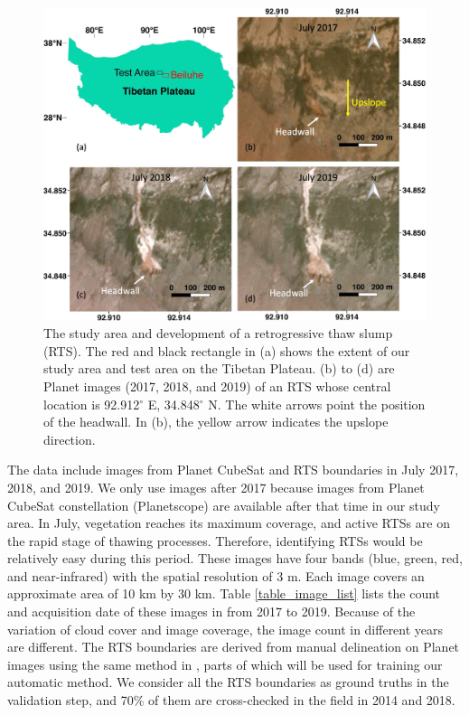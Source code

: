 \documentclass[authoryear,preprint,review,12pt]{elsarticle}
\begin{document}
\begin{figure} 
	\centering
	\includegraphics[width=14cm]{figs/rts_multi_images_study_area_v2_trim.jpg}
	\caption{The study area and development of a retrogressive thaw slump (RTS). The red and black rectangle in (a) shows the extent of our study area and test area on the Tibetan Plateau. (b) to (d) are Planet images (2017, 2018, and 2019) of an RTS whose central location is 92.912$^\circ$ E, 34.848$^\circ$ N. The white arrows point the position of the headwall. In (b), the yellow arrow indicates the upslope direction.}
	\label{fig_multi_rts_image_studyarea}
\end{figure}


The data include images from Planet CubeSat and RTS boundaries in July 2017, 2018, and 2019.
We only use images after 2017 because images from Planet CubeSat constellation (Planetscope) are available after that time in our study area.  
In July, vegetation reaches its maximum coverage, and active RTSs are on the rapid stage of thawing processes. 
Therefore, identifying RTSs would be relatively easy during this period.
These images have four bands (blue, green, red, and near-infrared) with the spatial resolution of 3 m. 
Each image covers an approximate area of 10 km by 30 km.
Table \ref{table_image_list} lists the count and acquisition date of these images in from 2017 to 2019. 
Because of the variation of cloud cover and image coverage, the image count in different years are different.
The RTS boundaries are derived from manual delineation on Planet images using the same method in \cite{huang2020using}, parts of which will be used for training our automatic method. 
We consider all the RTS boundaries as ground truths in the validation step, and 70\% of them are cross-checked in the field in 2014 and 2018. %
\end{document}
